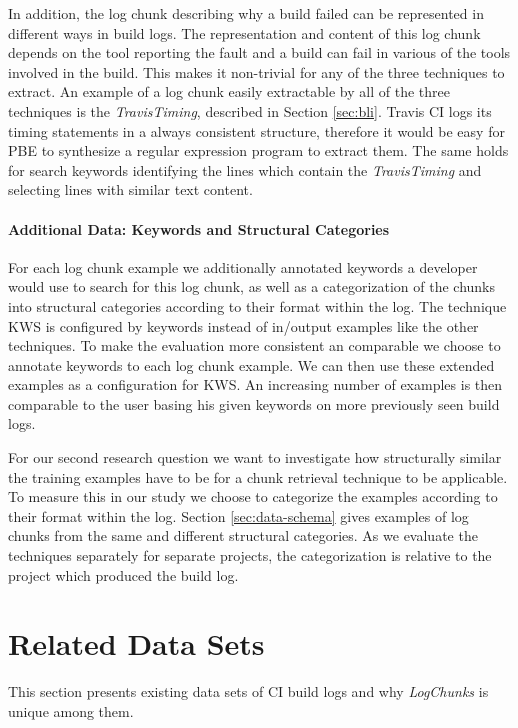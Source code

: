 \documentclass[\myrootdir/main.tex]{subfiles}
\begin{document}
In addition, the log chunk describing why a build failed can be represented in different ways in build logs.
The representation and content of this log chunk depends on the tool reporting the fault and a build can fail in various of the tools involved in the build.
This makes it non-trivial for any of the three techniques to extract.
An example of a log chunk easily extractable by all of the three techniques is the \emph{TravisTiming}, described in Section \ref{sec:bli}.
Travis CI logs its timing statements in a always consistent structure, therefore it would be easy for PBE to synthesize a regular expression program to extract them.
The same holds for search keywords identifying the lines which contain the \emph{TravisTiming} and selecting lines with similar text content.

\paragraph{Additional Data: Keywords and Structural Categories}
For each log chunk example we additionally annotated keywords a developer would use to search for this log chunk, as well as a categorization of the chunks into structural categories according to their format within the log.
The technique KWS is configured by keywords instead of in/output examples like the other techniques.
To make the evaluation more consistent an comparable we choose to annotate keywords to each log chunk example.
We can then use these extended examples as a configuration for KWS.
An increasing number of examples is then comparable to the user basing his given keywords on more previously seen build logs.

For our second research question we want to investigate how structurally similar the training examples have to be for a chunk retrieval technique to be applicable.
To measure this in our study we choose to categorize the examples according to their format within the log.
Section \ref{sec:data-schema} gives examples of log chunks from the same and different structural categories.
As we evaluate the techniques separately for separate projects, the categorization is relative to the project which produced the build log.

\section{Related Data Sets}
\label{sec:related-data-sets}
This section presents existing data sets of CI build logs and why \emph{LogChunks} is unique among them.
\end{document}
